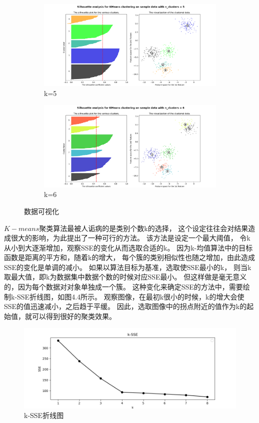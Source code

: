 \documentclass[bachelor,adobefonts]{jnuthesis}
\begin{document}
\begin{figure}[h!]
\begin{subfigure}[b]{0.4\linewidth}
    \includegraphics[width=\linewidth]{Wksh-5.png}
    \caption{k=5}
  \end{subfigure}
  \begin{subfigure}[b]{1.0\linewidth}
    \includegraphics[width=\linewidth]{Wksh-6.png}
    \caption{k=6}
  \end{subfigure}
  \caption{数据可视化}
\end{figure}

$K-means$聚类算法最被人诟病的是类别个数k的选择，
这个设定往往会对结果造成很大的影响，为此提出了一种可行的方法。
该方法是设定一个最大阈值，
令k从小到大逐渐增加，观察SSE的变化从而选取合适的k。
因为k-均值算法中的目标函数是距离的平方和，随着k的增大，
每个簇的类别相似性也随之增加，由此造成SSE的变化是单调的减小。
如果以算法目标为基准，选取使SSE最小的k，
则当k取最大值，即k为数据集中数据个数的时候对应SSE最小。
但这样做是毫无意义的，因为每个数据对对象单独成一个簇。
这种变化来确定SSE的方法中，需要绘制k-SSE折线图，如图4.4所示。
观察图像，在最初k很小的时候，k的增大会使SSE的值迅速减小，之后趋于平缓。
因此，选取图像中的拐点附近的值作为k的起始值，就可以得到很好的聚类效果。


\begin{figure}[h!]
  \centering
    \includegraphics[width=0.8\linewidth]{Wk-SSE.png}
  \caption{k-SSE折线图}
\end{figure}
\end{document}
